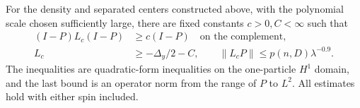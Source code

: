 \begin{proposition}\label{prop:continuous-control}
For the density and separated centers constructed above, with the
polynomial scale chosen sufficiently large, there are fixed constants
\(c>0,C<\infty\) such that
\[
 \begin{split}
 (I-P)L_c(I-P)&\ge c(I-P)\quad\text{on the complement},\\
 L_c&\ge -\Delta_y/2-C,\qquad
 \|L_cP\|\le p(n,D)\lambda^{-0.9}.
 \end{split}                                                       \tag{6}\label{eq:6}
\]
The inequalities are quadratic-form inequalities on the one-particle
$H^1$ domain, and the last bound is an operator norm from the range of
$P$ to $L^2$. All estimates hold with either spin included.
\end{proposition}

